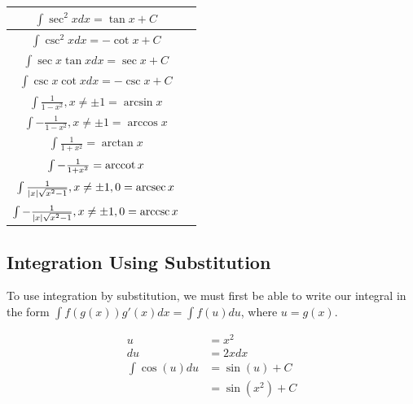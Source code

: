         \begin{center}
            \begin{tabular}{|c|c|}
                \hline
                $\int \sec^2{x}dx = \tan{x}+C$ & \\
                \hline
                $\int \csc^2{x}dx = -\cot{x}+C$ & \\
                \hline
                $\int \sec{x}\tan{x}dx = \sec{x}+C$ & \\
                \hline
                $\int \csc{x}\cot{x}dx = -\csc{x}+C$ & \\
                \hline
                $\int \frac{1}{1-x^2}, x\not =\pm 1 = \arcsin{x}$ & \\
                \hline
                $\int -\frac{1}{1-x^2}, x\not =\pm 1 = \arccos{x}$ & \\
                \hline
                $\int \frac{1}{1+x^2}=\arctan{x}$ & \\
                \hline
                $\int -\frac{1}{1+x^2}=\operatorname{arccot}{x}$ & \\
                \hline
                $\int \frac{1}{|x|\sqrt{x^2-1}}, x\not = \pm 1,0=\operatorname{arcsec}{x}$ & \\
                \hline
                $\int -\frac{1}{|x|\sqrt{x^2-1}}, x\not = \pm 1,0=\operatorname{arccsc}{x}$ & \\
                \hline
            \end{tabular}
        \end{center}


    \subsection{Integration Using Substitution}
        To use integration by substitution, we must first be able to write our integral in the
        form $\int f(g(x))g'(x)dx=\int f(u)du$, where $u=g(x)$. \\

        \noindent \color{blue}  \color{black}

        \begin{align*}
            u                   &= x^2 \\
            du                  &= 2xdx \\
            \int \cos{(u)}du    &= \sin{(u)}+C \\
            &= \sin{(x^2)} + C
        \end{align*}

